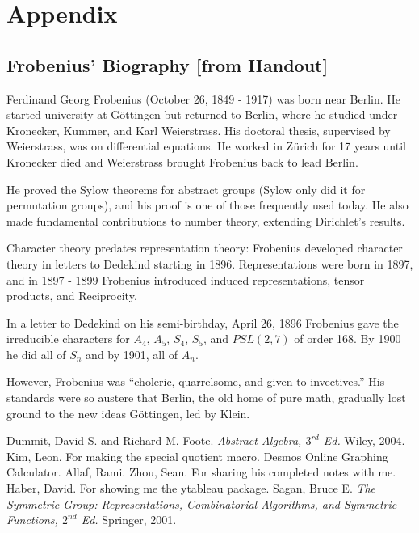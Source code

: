 \documentclass[12pt]{article}
\newcommand{\ita}[1]{\textit{#1}}
\theoremstyle{definition}
\begin{document}
\section{Appendix}
\subsection{Frobenius' Biography [from Handout]}
Ferdinand Georg Frobenius (October 26, 1849 - 1917) was born near Berlin. He started university at G\"ottingen but returned to Berlin, where he studied under Kronecker, Kummer, and Karl Weierstrass. His doctoral thesis, supervised by Weierstrass, was on differential equations. He worked in Z\"urich for 17 years until Kronecker died and Weierstrass brought Frobenius back to lead Berlin.

He proved the Sylow theorems for abstract groups (Sylow only did it for permutation groups), and his proof is one of those frequently used today. He also made fundamental contributions to number theory, extending Dirichlet's results.

Character theory predates representation theory: Frobenius developed character theory in letters to Dedekind starting in 1896. Representations were born in 1897, and in 1897 - 1899 Frobenius introduced induced representations, tensor products, and Reciprocity.

In a letter to Dedekind on his semi-birthday, April 26, 1896 Frobenius gave the irreducible characters for $A_4$, $A_5$, $S_4$, $S_5$, and $PSL(2,7)$ of order 168. By 1900 he did all of $S_n$ and by 1901, all of $A_n$.

However, Frobenius was ``choleric, quarrelsome, and given to invectives.'' His standards were so austere that Berlin, the old home of pure math, gradually lost ground to the new ideas G\"ottingen, led by Klein.

\newpage
{}
{}
\begin{thebibliography}{99}
     Dummit, David S. and Richard M. Foote. \ita{Abstract Algebra, $3^{rd}$ Ed.} Wiley, 2004.
     Kim, Leon. For making the special quotient macro.
     Desmos Online Graphing Calculator.
     Allaf, Rami.
     Zhou, Sean. For sharing his completed notes with me.
     Haber, David. For showing me the \textsf{ytableau} package.
     Sagan, Bruce E. \ita{The Symmetric Group: Representations, Combinatorial Algorithms, and Symmetric Functions, $2^{nd}$ Ed.} Springer, 2001.
\end{thebibliography}
\end{document}
